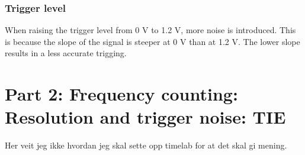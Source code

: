 \documentclass[11pt,english,a4paper]{article}
\begin{document}
\subsubsection{Trigger level}
When raising the trigger level from 0 V to 1.2 V, more noise is introduced. This is because the slope of the signal is steeper at 0 V than at 1.2 V. The lower slope results in a less accurate trigging. 

\section{Part 2: Frequency counting: Resolution and trigger noise: TIE}
Her veit jeg ikke hvordan jeg skal sette opp timelab for at det skal gi mening. 
\end{document}
